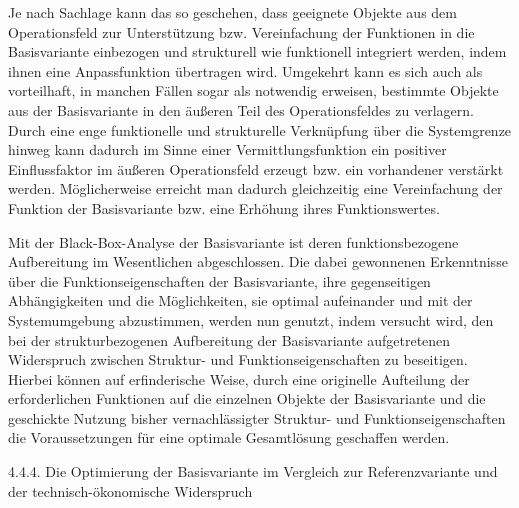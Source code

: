 \documentclass[12pt,a4paper]{article}
\begin{document}
Je nach Sachlage kann das so geschehen, dass geeignete Objekte aus dem
Operationsfeld zur Unterstützung bzw. Vereinfachung der Funktionen in die
Basisvariante einbezogen und strukturell wie funktionell integriert werden,
indem ihnen eine Anpassfunktion übertragen wird. Umgekehrt kann es sich auch
als vorteilhaft, in manchen Fällen sogar als notwendig erweisen, bestimmte
Objekte aus der Basisvariante in den äußeren Teil des Operationsfeldes zu
verlagern. Durch eine enge funktionelle und strukturelle Verknüpfung über die
Systemgrenze hinweg kann dadurch im Sinne einer Vermittlungsfunktion ein
positiver Einflussfaktor im äußeren Operationsfeld erzeugt bzw. ein
vorhandener verstärkt werden. Möglicherweise erreicht man dadurch gleichzeitig
eine Vereinfachung der Funktion der Basisvariante bzw. eine Erhöhung ihres
Funktionswertes.

Mit der Black-Box-Analyse der Basisvariante ist deren funktionsbezogene
Aufbereitung im Wesentlichen abgeschlossen. Die dabei gewonnenen Erkenntnisse
über die Funktionseigenschaften der Basisvariante, ihre gegenseitigen
Abhängigkeiten und die Möglichkeiten, sie optimal aufeinander und mit der
Systemumgebung abzustimmen, werden nun genutzt, indem versucht wird, den bei
der strukturbezogenen Aufbereitung der Basisvariante aufgetretenen Widerspruch
zwischen Struktur- und Funktionseigenschaften zu beseitigen. Hierbei können
auf erfinderische Weise, durch eine originelle Aufteilung der erforderlichen
Funktionen auf die einzelnen Objekte der Basisvariante und die geschickte
Nutzung bisher vernachlässigter Struktur- und Funktionseigenschaften die
Voraussetzungen für eine optimale Gesamtlösung geschaffen werden.


4.4.4.  Die Optimierung der Basisvariante im Vergleich zur Referenzvariante
und der technisch-ökonomische Widerspruch
\end{document}
